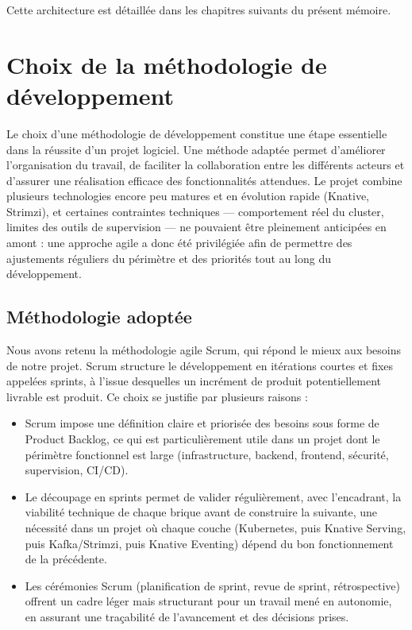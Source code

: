 Cette architecture est détaillée dans les chapitres suivants du présent mémoire.

\section{Choix de la méthodologie de développement}

Le choix d'une méthodologie de développement constitue une étape essentielle dans la réussite d'un projet logiciel. Une méthode adaptée permet d'améliorer l'organisation du travail, de faciliter la collaboration entre les différents acteurs et d'assurer une réalisation efficace des fonctionnalités attendues. Le projet combine plusieurs technologies encore peu matures et en évolution rapide (Knative, Strimzi), et certaines contraintes techniques — comportement réel du cluster, limites des outils de supervision — ne pouvaient être pleinement anticipées en amont : une approche agile a donc été privilégiée afin de permettre des ajustements réguliers du périmètre et des priorités tout au long du développement.

\subsection{Méthodologie adoptée}

Nous avons retenu la méthodologie agile Scrum, qui répond le mieux aux besoins de notre projet. Scrum structure le développement en itérations courtes et fixes appelées sprints, à l'issue desquelles un incrément de produit potentiellement livrable est produit. Ce choix se justifie par plusieurs raisons :

\begin{itemize}
    \item Scrum impose une définition claire et priorisée des besoins sous forme de Product Backlog, ce qui est particulièrement utile dans un projet dont le périmètre fonctionnel est large (infrastructure, backend, frontend, sécurité, supervision, CI/CD).
    \item Le découpage en sprints permet de valider régulièrement, avec l'encadrant, la viabilité technique de chaque brique avant de construire la suivante, une nécessité dans un projet où chaque couche (Kubernetes, puis Knative Serving, puis Kafka/Strimzi, puis Knative Eventing) dépend du bon fonctionnement de la précédente.
    \item Les cérémonies Scrum (planification de sprint, revue de sprint, rétrospective) offrent un cadre léger mais structurant pour un travail mené en autonomie, en assurant une traçabilité de l'avancement et des décisions prises.
\end{itemize}

